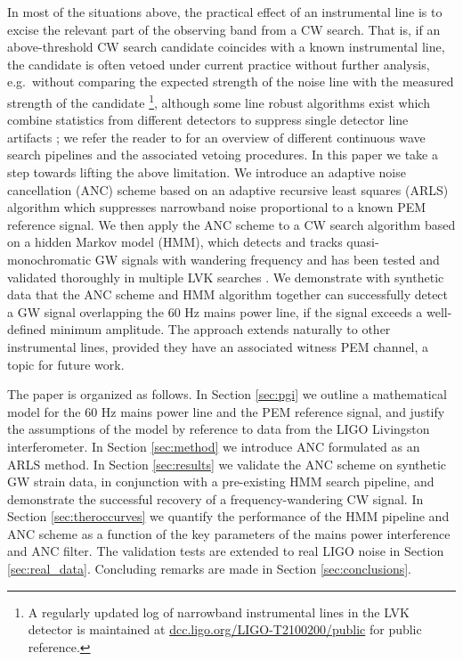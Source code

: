 \documentclass[pra,superscriptaddress,reprint,amsmath,amssymb,nofootinbib]{revtex4-2}
\begin{document}
In most  of the situations above, the practical effect of an instrumental line is to excise the relevant part of the observing band from a CW search. That is, if an above-threshold CW search candidate coincides with a known instrumental line, the candidate is often vetoed under current practice without further analysis, e.g.\ without comparing the expected strength of the noise line with the measured strength of the candidate \footnote{A regularly updated log of narrowband instrumental lines in the LVK detector is maintained at \href{https://dcc.ligo.org/LIGO-T2100200/public}{dcc.ligo.org/LIGO-T2100200/public} for public reference.}, although some line robust algorithms exist which combine statistics from different detectors to suppress single detector line artifacts \cite{KeitelEtAl:2014,2015CQGra..32c5004K,PhysRevD.93.084024,Keitel_2016}; we refer the reader to \cite{2022PhRvD.106j2008A} for an overview of different continuous wave search pipelines and the associated vetoing procedures. In this paper we take a step towards lifting the above limitation. We introduce an adaptive noise cancellation (ANC) scheme  based on an adaptive recursive least squares (ARLS) algorithm which suppresses narrowband noise proportional to a known PEM reference signal. We then apply the ANC scheme to a CW search algorithm based on a hidden Markov model (HMM), which detects and tracks quasi-monochromatic GW signals with wandering frequency and has been tested and validated thoroughly in multiple LVK searches \cite{Suvorova2016PhRv,Piccinni2022,Riles2023,Wette2023}. We demonstrate with synthetic data that the ANC scheme and HMM algorithm together can successfully detect a GW signal overlapping the 60 Hz mains power line, if the signal exceeds a well-defined minimum amplitude. The approach extends naturally to other instrumental lines, provided they have an associated witness PEM channel, a topic for future work. \newline 

The paper is organized as follows. In Section \ref{sec:pgi} we outline a mathematical model for the 60 Hz mains power line and the PEM reference signal, and justify the assumptions of the model by reference to data from the LIGO Livingston interferometer.  In Section \ref{sec:method} we introduce ANC formulated as an ARLS method. In Section \ref{sec:results} we validate the ANC scheme on synthetic GW strain data, in conjunction with a pre-existing HMM search pipeline, and demonstrate the successful recovery of a frequency-wandering CW signal. In Section \ref{sec:theroccurves} we quantify the performance of the HMM pipeline and ANC scheme as a function of the key parameters of the mains power interference and ANC filter. The validation tests are extended to real LIGO noise in Section \ref{sec:real_data}. Concluding remarks are made in Section \ref{sec:conclusions}.
\end{document}
